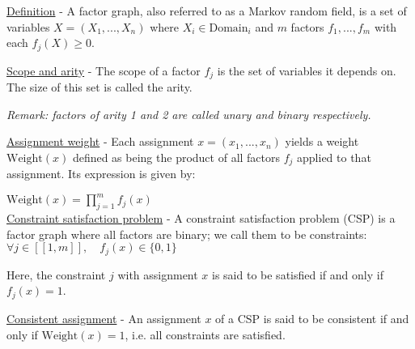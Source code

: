 \documentclass[4pt,landscape]{article}
\begin{document}
\begin{multicols*}{4}
 {\tiny \underline{Definition} - A factor graph, also referred to as a Markov random field, is a set of variables $X=(X_1,...,X_n)$ where $X_i\in\textrm{Domain}_i$ and $m$ factors $f_1,...,f_m$ with each $f_j(X)\geqslant 0$.}\par
 {\tiny \underline{Scope and arity} - The scope of a factor $f_j$ is the set of variables it depends on. The size of this set is called the arity.}\par
 {\tiny \textit{Remark: factors of arity 1 and 2 are called unary and binary respectively.}}\par
 {\tiny \underline{Assignment weight} - Each assignment $x=(x_1,...,x_n)$ yields a weight $\textrm{Weight}(x)$ defined as being the product of all factors $f_j$ applied to that assignment. Its expression is given by:}\par $\textrm{Weight}(x)=\prod_{j=1}^mf_j(x)$\\
 {\tiny \underline{Constraint satisfaction problem} - A constraint satisfaction problem (CSP) is a factor graph where all factors are binary; we call them to be constraints: $\forall j\in[\![1,m]\!],\quad f_j(x)\in\{0,1\}$}\par
 {Here, the constraint $j$ with assignment $x$ is said to be satisfied if and only if $f_j(x)=1$.}\par
 {\tiny \underline{Consistent assignment} - An assignment $x$ of a CSP is said to be consistent if and only if $\textrm{Weight}(x)=1$, i.e. all constraints are satisfied.}\par


\end{multicols*}
\end{document}
